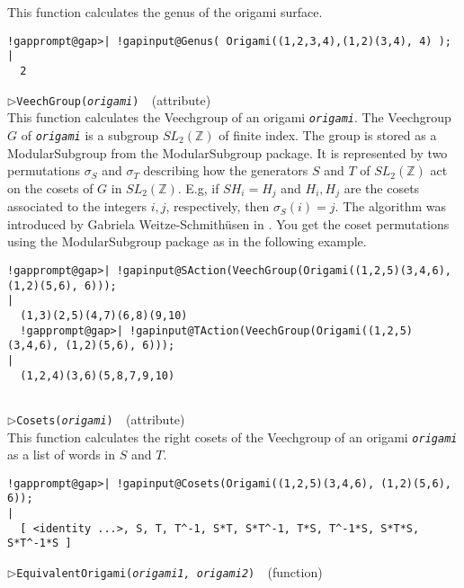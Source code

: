 \documentclass[a4paper,11pt]{report}
\begin{document}
{{{ This function calculates the genus of the origami surface. 
\begin{Verbatim}[commandchars=!@|,fontsize=\small,frame=single,label=Example]
  !gapprompt@gap>| !gapinput@Genus( Origami((1,2,3,4),(1,2)(3,4), 4) );
|
  2
\end{Verbatim}
 \noindent\textcolor{FuncColor}{$\triangleright$\enspace\texttt{VeechGroup({\mdseries\slshape origami})
\label{VeechGroup}
}\hfill{\scriptsize (attribute)}}\\


 This function calculates the Veechgroup of an origami \mbox{\texttt{\mdseries\slshape origami}}. The Veechgroup $G$ of \mbox{\texttt{\mdseries\slshape origami}} is a subgroup $SL_2(\mathbb{Z})$ of finite index. The group is stored as a ModularSubgroup from the \textsf{ModularSubgroup} package. It is represented by two permutations $\sigma_S$ and $\sigma_T$ describing how the generators $S$ and $T$ of $SL_2(\mathbb{Z})$ act on the cosets of $G$ in $SL_2(\mathbb{Z})$. E.g, if $SH_i = H_j$ and $H_i,H_j$ are the cosets associated to the integers $i,j$, respectively, then $\sigma_S(i)=j$. The algorithm was introduced by Gabriela Weitze-Schmith{\"u}sen in \cite{weitze_schmithuesen_phd}. You get the coset permutations using the \textsf{ModularSubgroup} package as in the following example. 
\begin{Verbatim}[commandchars=!@|,fontsize=\small,frame=single,label=Example]
  !gapprompt@gap>| !gapinput@SAction(VeechGroup(Origami((1,2,5)(3,4,6), (1,2)(5,6), 6)));
|
  (1,3)(2,5)(4,7)(6,8)(9,10)
  !gapprompt@gap>| !gapinput@TAction(VeechGroup(Origami((1,2,5)(3,4,6), (1,2)(5,6), 6)));
|
  (1,2,4)(3,6)(5,8,7,9,10)
          
\end{Verbatim}
 \noindent\textcolor{FuncColor}{$\triangleright$\enspace\texttt{Cosets({\mdseries\slshape origami})
\label{Cosets}
}\hfill{\scriptsize (attribute)}}\\


 This function calculates the right cosets of the Veechgroup of an origami \mbox{\texttt{\mdseries\slshape origami}} as a list of words in $S$ and $T$. 
\begin{Verbatim}[commandchars=!@|,fontsize=\small,frame=single,label=Example]
  !gapprompt@gap>| !gapinput@Cosets(Origami((1,2,5)(3,4,6), (1,2)(5,6), 6));
|
  [ <identity ...>, S, T, T^-1, S*T, S*T^-1, T*S, T^-1*S, S*T*S, S*T^-1*S ]
\end{Verbatim}
 \noindent\textcolor{FuncColor}{$\triangleright$\enspace\texttt{EquivalentOrigami({\mdseries\slshape origami1, origami2})
\label{EquivalentOrigami}
}\hfill{\scriptsize (function)}}\\


}}}
\end{document}
